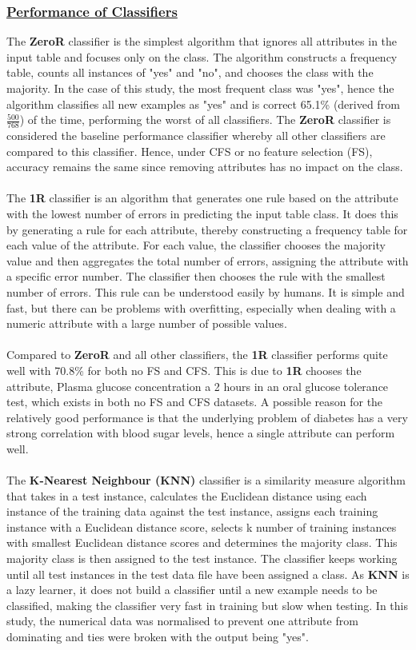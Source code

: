 \documentclass{article}
\begin{document}
    \subsubsection*{\underline{Performance of Classifiers}}
    The \textbf{ZeroR} classifier is the simplest algorithm that ignores all attributes in the input table and focuses only on the class. The algorithm constructs a frequency table, counts all instances of "yes" and "no", and chooses the class with the majority. In the case of this study, the most frequent class was "yes", hence the algorithm classifies all new examples as "yes" and is correct 65.1\% (derived from $\frac{500}{768}$) of the time, performing the worst of all classifiers. The \textbf{ZeroR} classifier is considered the baseline performance classifier whereby all other classifiers are compared to this classifier. Hence, under CFS or no feature selection (FS),  accuracy remains the same since removing attributes has no impact on the class. 
    \\
    \\
    The \textbf{1R} classifier is an algorithm that generates one rule based on the attribute with the lowest number of errors in predicting the input table class. It does this by generating a rule for each attribute, thereby constructing a frequency table for each value of the attribute. For each value, the classifier chooses the majority value and then aggregates the total number of errors, assigning the attribute with a specific error number. The classifier then chooses the rule with the smallest number of errors. This rule can be understood easily by humans. It is simple and fast, but there can be problems with overfitting, especially when dealing with a numeric attribute with a large number of possible values.
    \\
    \\
    Compared to \textbf{ZeroR} and all other classifiers, the \textbf{1R} classifier performs quite well with  70.8\% for both no FS and CFS. This is due to \textbf{1R} chooses the attribute, Plasma glucose concentration a 2 hours in an oral glucose tolerance test, which exists in both no FS and CFS datasets. A possible reason for the relatively good performance is that the underlying problem of diabetes has a very strong correlation with blood sugar levels, hence a single attribute can perform well.
    \\
    \\
    The \textbf{K-Nearest Neighbour (KNN)} classifier is a similarity measure algorithm that takes in a test instance, calculates the Euclidean distance using each instance of the training data against the test instance, assigns each training instance with a Euclidean distance score, selects k number of training instances with smallest Euclidean distance scores and determines the majority class. This majority class is then assigned to the test instance. The classifier keeps working until all test instances in the test data file have been assigned a class. As \textbf{KNN} is a lazy learner, it does not build a classifier until a new example needs to be classified, making the classifier very fast in training but slow when testing. In this study, the numerical data was normalised to prevent one attribute from dominating and ties were broken with the output being "yes".
\end{document}
